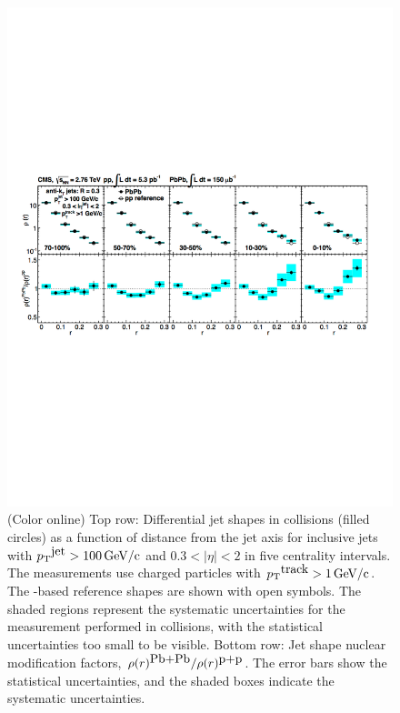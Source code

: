 \begin{figure}[!h]
\begin{center}
\includegraphics[width=0.98\mboxwidth]{jetfigures/JetShapes_GR.pdf}
\caption{\label{fig:JSRatio}
(Color online) Top row: Differential jet shapes in \PbPb collisions (filled circles)
 as a function of distance from the jet axis for inclusive jets with $\mbox{$p_{\mathrm{T}}$}^{\mbox{jet}} >100\,\mathrm{GeV/c}$ 
and $0.3 < |\eta| < 2$ in
five \PbPb centrality intervals. The measurements use charged particles with  $\mbox{$p_{\mathrm{T}}$}^{\mbox{track}} > 1\,\mathrm{GeV/c}$.
The \pp-based reference shapes  are shown with open symbols.
The shaded regions represent the systematic uncertainties for the measurement performed in \PbPb collisions, with the
statistical uncertainties too small to be visible.
Bottom row: Jet shape nuclear modification factors, $\rho(r)^{\mbox{Pb+Pb}}/\rho(r)^{\mbox{p+p}}$.
The error bars show the statistical uncertainties, and the shaded boxes indicate the systematic uncertainties. }
\label{fig:GR:CMS_jetshapes}
\end{center}
\end{figure}

